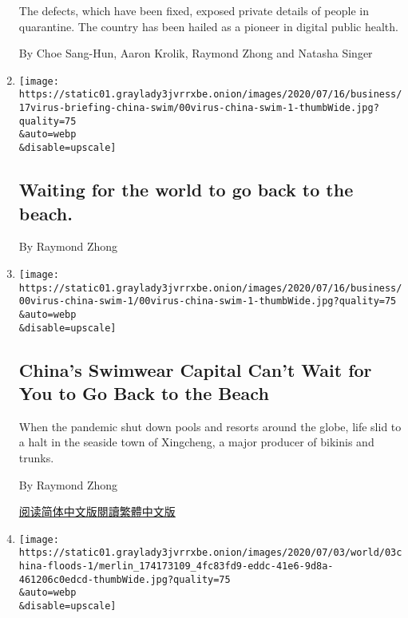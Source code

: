 \begin{enumerate}
  The defects, which have been fixed, exposed private details of people
  in quarantine. The country has been hailed as a pioneer in digital
  public health.

  By Choe Sang-Hun, Aaron Krolik, Raymond Zhong and Natasha Singer
\item
  \href{/live/2020/07/17/business/stock-market-today-coronavirus/waiting-for-the-world-to-go-back-to-the-beach}{}

  \texttt{[image: https://static01.graylady3jvrrxbe.onion/images/2020/07/16/business/17virus-briefing-china-swim/00virus-china-swim-1-thumbWide.jpg?quality=75\\\&auto=webp\\\&disable=upscale]}

  \hypertarget{waiting-for-the-world-to-go-back-to-the-beach}{%
  \subsection{Waiting for the world to go back to the
  beach.}\label{waiting-for-the-world-to-go-back-to-the-beach}}

  By Raymond Zhong
\item
  \href{/2020/07/17/business/china-coronavirus-swimsuits.html}{}

  \texttt{[image: https://static01.graylady3jvrrxbe.onion/images/2020/07/16/business/00virus-china-swim-1/00virus-china-swim-1-thumbWide.jpg?quality=75\\\&auto=webp\\\&disable=upscale]}

  \hypertarget{chinas-swimwear-capital-cant-wait-for-you-to-go-back-to-the-beach}{%
  \subsection{China's Swimwear Capital Can't Wait for You to Go Back to
  the
  Beach}\label{chinas-swimwear-capital-cant-wait-for-you-to-go-back-to-the-beach}}

  When the pandemic shut down pools and resorts around the globe, life
  slid to a halt in the seaside town of Xingcheng, a major producer of
  bikinis and trunks.

  By Raymond Zhong

  \href{https://cn.nytimes3xbfgragh.onion/business/20200720/china-coronavirus-swimsuits/}{阅读简体中文版}\href{https://cn.nytimes3xbfgragh.onion/business/20200720/china-coronavirus-swimsuits/zh-hant/}{閱讀繁體中文版}
\item
  \href{/2020/07/03/world/asia/china-floods-rain.html}{}

  \texttt{[image: https://static01.graylady3jvrrxbe.onion/images/2020/07/03/world/03china-floods-1/merlin\_174173109\_4fc83fd9-eddc-41e6-9d8a-461206c0edcd-thumbWide.jpg?quality=75\\\&auto=webp\\\&disable=upscale]}


\end{enumerate}

